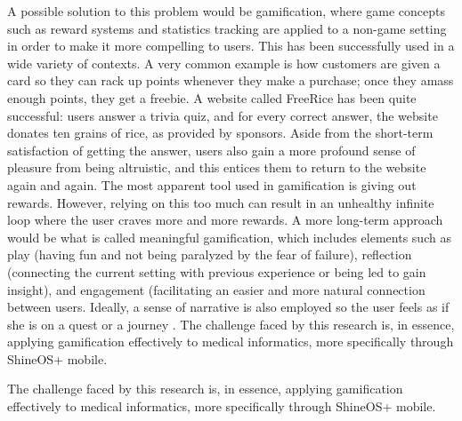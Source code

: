 A possible solution to this problem would be gamification, where game concepts such as reward systems and statistics tracking are applied to a non-game setting in order to make it more compelling to users. This has been successfully used in a wide variety of contexts. A very common example is how customers are given a card so they can rack up points whenever they make a purchase; once they amass enough points, they get a freebie. A website called FreeRice has been quite successful: users answer a trivia quiz, and for every correct answer, the website donates ten grains of rice, as provided by sponsors. Aside from the short-term satisfaction of getting the answer, users also gain a more profound sense of pleasure from being altruistic, and this entices them to return to the website again and again. The most apparent tool used in gamification is giving out rewards. However, relying on this too much can result in an unhealthy infinite loop where the user craves more and more rewards. A more long-term approach would be what is called meaningful gamification, which includes elements such as play (having fun and not being paralyzed by the fear of failure), reflection (connecting the current setting with previous experience or being led to gain insight), and engagement (facilitating an easier and more natural connection between users. Ideally, a sense of narrative is also employed so the user feels as if she is on a quest or a journey \cite{scottnicholson2014}. The challenge faced by this research is, in essence, applying gamification effectively to medical informatics, more specifically through ShineOS+ mobile.

The challenge faced by this research is, in essence, applying gamification effectively to medical informatics, more specifically through ShineOS+ mobile.


